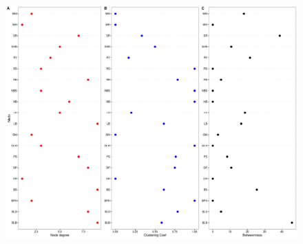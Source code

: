 \afterpage{\clearpage}
\begin{figure}[p!]
    \centering
        \includegraphics[width = 1\textwidth]{figures/nodepropidn_ds.pdf}
\end{figure}

